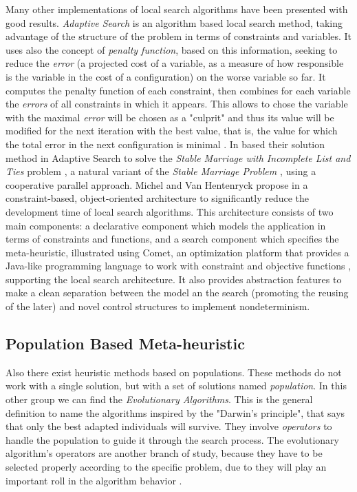 Many other implementations of local search algorithms have been presented with good results. {\it Adaptive Search} is an algorithm based local search method, taking advantage of the structure of the problem in terms of constraints and variables. It uses also the concept of \textit{penalty function}, based on this information, seeking to reduce the \textit{error} (a projected cost of a variable, as a measure of how responsible is the variable in the cost of a configuration) on the worse variable so far. It computes the penalty function of each constraint, then combines for each variable the \textit{errors} of all constraints in which it appears. This allows to chose the variable with the maximal \textit{error} will be chosen as a "culprit" and thus its value will be modified for the next iteration with the best value, that is, the value for which the total error in the next configuration is minimal \cite{Diaz, Codognet2001, Caniou14}. In \cite{Munera2015}  based their solution method in Adaptive Search to solve the \textit{Stable Marriage with Incomplete List and Ties} problem \cite{Iwama1999}, a natural variant of the \textit{Stable Marriage Problem} \cite{Gale1962}, using a cooperative parallel approach. Michel and Van Hentenryck propose in \cite{Michel2002} a constraint-based, object-oriented architecture to significantly reduce the development time of local search algorithms. This architecture consists of two main components: a declarative component which models the application in terms of constraints and functions, and a search component which specifies the meta-heuristic, illustrated using {\sc Comet}, an optimization platform that provides a Java-like programming language to work with constraint and objective functions \cite{Comet, Michel2005}, supporting the local search architecture. It also provides abstraction features to make a clean separation between the model an the search (promoting the reusing of the later) and novel control structures to implement nondeterminism.

\subsection{Population Based Meta-heuristic}

Also there exist heuristic methods based on populations. These methods do not work with a single solution, but with a set of solutions named {\it population}. In this other group we can find the {\it Evolutionary Algorithms}. This is the general definition to name the algorithms inspired by the "Darwin's principle", that says that only the best adapted individuals will survive. They involve {\it operators} to handle the population to guide it through the search process. The evolutionary algorithm's operators are another branch of study, because they have to be selected properly according to the specific problem, due to they will play an important roll in the algorithm behavior \cite{Maturana2012}. 


